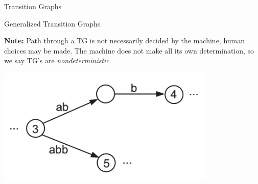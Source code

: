 \documentclass{article}
\begin{document}
\begin{multicols*}{3}
\begin{blackbox}{Transition Graphs}
\begin{redbox}{Generalized Transition Graphs}
    \end{redbox}
    \textbf{Note:} Path through a TG is not necessarily decided by the machine, human choices may be made. The machine does not make all its own determination, so we say TG's are \emph{nondeterministic}.
    \vspace{-2ex}
    \begin{center}
        \includegraphics[width=0.78\textwidth]{nd_tg.png}
    \end{center}
    \vspace{-3ex}
\end{blackbox}
    



\end{multicols*}
\end{document}
